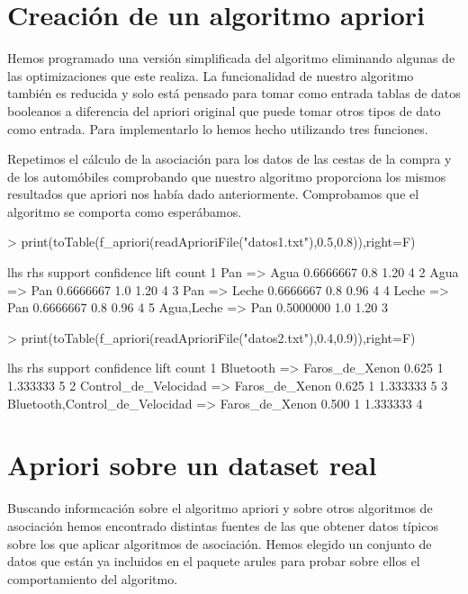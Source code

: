 \documentclass [a4paper] {article}
\begin{document}
\section{Creación de un algoritmo apriori}
Hemos programado una versión simplificada del algoritmo eliminando algunas de las optimizaciones que este realiza.
La funcionalidad de nuestro algoritmo también es reducida y solo está pensado para tomar como entrada tablas de datos booleanos 
a diferencia del apriori original que puede tomar otros tipos de dato como entrada.
Para implementarlo lo hemos hecho utilizando tres funciones.

Repetimos el cálculo de la asociación para los datos de las cestas de la compra y de los automóbiles comprobando que nuestro algoritmo proporciona
los mismos resultados que apriori nos había dado anteriormente. Comprobamos que el algoritmo se comporta como esperábamos.
\begin{Schunk}
\begin{Sinput}
> print(toTable(f_apriori(readAprioriFile("datos1.txt"),0.5,0.8)),right=F)
\end{Sinput}
\begin{Soutput}
  lhs             rhs     support   confidence lift count
1 {Pan}        => {Agua}  0.6666667 0.8        1.20 4    
2 {Agua}       => {Pan}   0.6666667 1.0        1.20 4    
3 {Pan}        => {Leche} 0.6666667 0.8        0.96 4    
4 {Leche}      => {Pan}   0.6666667 0.8        0.96 4    
5 {Agua,Leche} => {Pan}   0.5000000 1.0        1.20 3    
\end{Soutput}
\begin{Sinput}
> print(toTable(f_apriori(readAprioriFile("datos2.txt"),0.4,0.9)),right=F)
\end{Sinput}
\begin{Soutput}
  lhs                                 rhs              support confidence lift     count
1 {Bluetooth}                      => {Faros_de_Xenon} 0.625   1          1.333333 5    
2 {Control_de_Velocidad}           => {Faros_de_Xenon} 0.625   1          1.333333 5    
3 {Bluetooth,Control_de_Velocidad} => {Faros_de_Xenon} 0.500   1          1.333333 4    
\end{Soutput}
\end{Schunk}

\section{Apriori sobre un dataset real}
Buscando informcación sobre el algoritmo apriori y sobre otros algoritmos de asociación hemos encontrado distintas fuentes de las que obtener datos típicos 
sobre los que aplicar algoritmos de asociación.
Hemos elegido un conjunto de datos que están ya incluidos en el paquete arules para probar sobre ellos el comportamiento del algoritmo.
\end{document}
